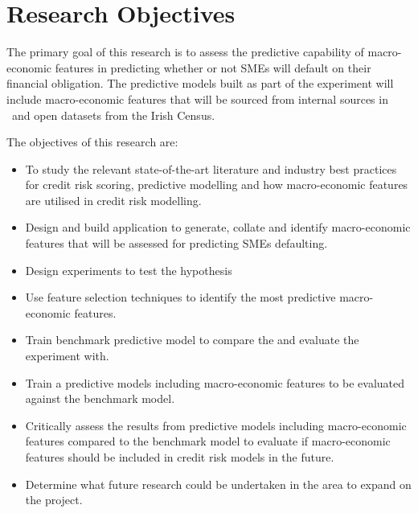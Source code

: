 \section{Research Objectives}
The primary goal of this research is to assess the predictive capability of macro-economic features in predicting whether or not SMEs will default on their financial obligation. The predictive models built as part of the experiment will include macro-economic features that will be sourced from internal sources in \subjectname\ and open datasets from the Irish Census.

 
The objectives of this research are:

\begin{itemize}
	\item To study the relevant state-of-the-art literature and industry best practices for credit risk scoring, predictive modelling and how macro-economic features are utilised in credit risk modelling.
	
	\item Design and build application to generate, collate and identify macro-economic features that will be assessed for predicting SMEs defaulting.
	
	\item Design experiments to test the hypothesis
	
	\item Use feature selection techniques to identify the most predictive  macro-economic features.
	
	\item Train benchmark predictive model to compare the and evaluate the experiment with.
	
	\item Train a predictive models including macro-economic features to be evaluated against the benchmark model.

	\item Critically assess the results from predictive models including macro-economic features compared to the benchmark model to evaluate if macro-economic features should be included in credit risk models in the future.

	\item Determine what future research could be undertaken in the area to expand on the project.
\end{itemize}
	

